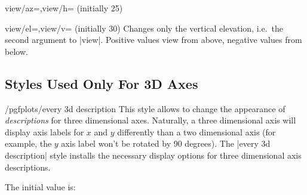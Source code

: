 {\begin{pgfplotskeylist}{view/az=,view/h= (initially 25)}
\pgfplotsexpensiveexample
\begin{codeexample}[]
\end{codeexample}

\pgfplotsexpensiveexample
\begin{codeexample}[]
\end{codeexample}
\end{pgfplotskeylist}

\begin{pgfplotskeylist}{view/el=,view/v= (initially 30)}
	Changes only the vertical elevation, i.e.\ the second argument to |view|. Positive values view from above, negative values from below. 
\end{pgfplotskeylist}

\subsection{Styles Used Only For 3D Axes}
\begin{stylekey}{/pgfplots/every 3d description}
	This style allows to change the appearance of \emph{descriptions} for three dimensional axes. Naturally, a three dimensional axis will display axis labels for $x$ and $y$ differently  than a two dimensional axis (for example, the $y$ axis label won't be rotated by 90 degrees). The |every 3d description| style installs the necessary display options for three dimensional axis descriptions.

	The initial value is:
\begin{codeexample}
\end{codeexample}


\end{stylekey}}
